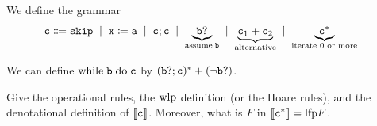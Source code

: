 {{\begin{example}
\end{example}


\begin{definition}
    \label{cl17:def:hw}
    We define the grammar
        \begin{align*}
         \mathtt{c} &\Coloneqq \mathtt{skip} \; \mid \;  \mathtt{x} \coloneqq \mathtt{a} \; \mid \; \mathtt{c}; \mathtt{c} \; \mid \; 
         \underbrace{\mathtt{b} ?}_{\text{assume}\; \mathtt{b}} \; \mid \; \underbrace{ \mathtt{c}_1 + \mathtt{c}_2}_{\text{alternative}} \; \mid \; \underbrace{ \mathtt{c}^*}_{\text{iterate $0$ or more}}
    \end{align*}
\end{definition}

\begin{example}
    We can define $\mathrm{while}\;\mathtt{b}\;\mathrm{do}\;\mathtt{c}$ by $(\mathtt{b}?; \mathtt{c})^*+(\neg \mathtt{b} ?)$.
\end{example}

\begin{exercise}
    Give the operational rules, the $\mathrm{wlp}$ definition (or the Hoare rules), and the denotational definition of $\llbracket \mathtt{c} \rrbracket$. Moreover, what is $F$ in $\llbracket \mathtt{c}^* \rrbracket= \mathrm{lfp} F$.
\end{exercise}







}}

